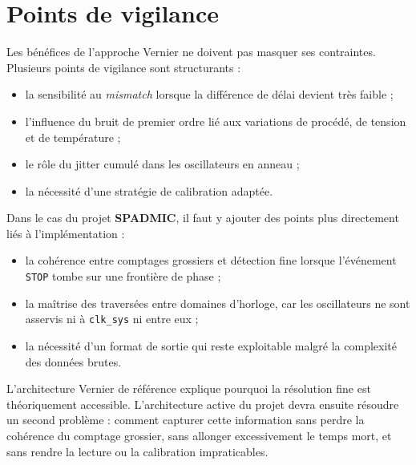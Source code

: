 \section{Points de vigilance}

Les bénéfices de l'approche Vernier ne doivent pas masquer ses contraintes. Plusieurs points de vigilance sont structurants \cite{annagrebah2021thesis} :
\begin{itemize}
    \item la sensibilité au \textit{mismatch} lorsque la différence de délai devient très faible ;
    \item l’influence du bruit de premier ordre lié aux variations de procédé, de tension et de température ;
    \item le rôle du jitter cumulé dans les oscillateurs en anneau ;
    \item la nécessité d’une stratégie de calibration adaptée.
\end{itemize}

Dans le cas du projet \textbf{SPADMIC}, il faut y ajouter des points plus directement liés à l'implémentation :
\begin{itemize}
    \item la cohérence entre comptages grossiers et détection fine lorsque l'événement \texttt{STOP} tombe sur une frontière de phase ;
    \item la maîtrise des traversées entre domaines d'horloge, car les oscillateurs ne sont asservis ni à \texttt{clk\_sys} ni entre eux ;
    \item la nécessité d'un format de sortie qui reste exploitable malgré la complexité des données brutes.
\end{itemize}

\begin{summaryBox}
L'architecture Vernier de référence explique pourquoi la résolution fine est théoriquement accessible. L'architecture active du projet devra ensuite résoudre un second problème : comment capturer cette information sans perdre la cohérence du comptage grossier, sans allonger excessivement le temps mort, et sans rendre la lecture ou la calibration impraticables.
\end{summaryBox}

\clearpage
